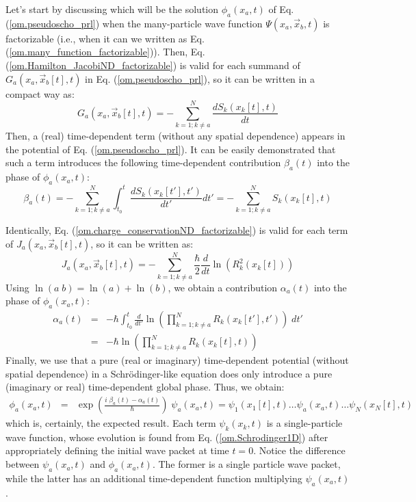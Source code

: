 \documentclass[onecolumn,nofootinbib, secnumarabic, amsmath, nobibnotes,12pt,aps,pra]{revtex4-1}
\newcommand{\eref}[1]{Eq. (\ref{#1})}
\begin{document}
Let's start by discussing which  will be the solution
$\phi_{a}(x_{a},t)$ of \eref{om.pseudoscho_prl} when the
many-particle wave function $\Psi(x_a,\vec x_b,t)$ is factorizable
(i.e., when it can we written as
\eref{om.many_function_factorizable}). Then,
\eref{om.Hamilton_JacobiND_factorizable} is valid for each summand
of $G_{a}(x_{a},\vec x_{b}[t],t)$ in
\eref{om.pseudoscho_prl}, so it can be written in a compact way as:
\begin{equation}
\label{om.prlpas_factorizable1}
G_{a}(x_{a},\vec x_{b}[t],t) = -\sum_{k = 1;k\neq a}^{N} \frac {d S_k(x_k[t],t)} {dt}
\end{equation}
Then, a (real) time-dependent term (without any spatial dependence)
appears in the potential of \eref{om.pseudoscho_prl}. It can be
easily demonstrated that such a term introduces the following
time-dependent contribution  \textit{$ \beta_a(t)$} into the phase of
$\phi_a(x_a,t)$:
\begin{equation}
\label{om.prlbeta}
\beta_a(t) = - \sum_{k = 1;k\neq a}^{N} \int_{t_0}^{t} \frac {d S_k(x_k[t'],t')} {dt'} dt' = -\sum_{k = 1;k\neq a}^{N} S_k(x_k[t],t)
\end{equation}

Identically, \eref{om.charge_conservationND_factorizable} is valid for each term of $J_{a}(x_{a},\vec x_{b}[t],t)$, so it can be written as:
\begin{equation}
\label{om.prlpas_factorizable2}
J_{a}(x_{a},\vec x_{b}[t],t) = -\sum_{k = 1;k\neq a}^{N} \frac {\hbar} {2} \frac {d} {dt} \ln \left( R_{k}^2(x_k[t]) \right)
\end{equation}
Using $\ln (a \; b) = \ln (a) + \ln (b)$, we obtain a contribution  $\alpha_a(t)$ into the phase of $\phi_a(x_a,t)$:
\begin{eqnarray}
\label{om.prlalpha} \alpha_a(t) &=& -\hbar \int_{t_0}^{t} \frac {d}
{dt'} \ln \left( \prod_{k = 1;k\neq a}^{N} R_k(x_k[t'],t') \right) \;
dt'\nonumber\\ &=& -\hbar \ln \left( \prod_{k = 1;k\neq a}^{N}
R_k(x_k[t],t) \right)
\end{eqnarray}
Finally, we use that a pure (real or imaginary) time-dependent
potential (without spatial dependence) in a Schr\"odinger-like
equation does only introduce a pure (imaginary or real)
time-dependent global phase. Thus, we obtain:
\begin{eqnarray}
\label{om.prlpas_factorizable3}
\phi_a(x_a,t) &=& \exp\left(\frac {i \; \beta_a(t)-\alpha_a(t)} {\hbar}\right) \;\psi_a(x_a,t)= \psi_1(x_1[t],t)\ldots\psi_a(x_a,t)\ldots\psi_N(x_N[t],t)
\end{eqnarray}
which is, certainly, the expected result. Each term \textit{$\psi_k(x_k,t)$} is a single-particle wave function, whose evolution is found from \eref{om.Schrodinger1D} after appropriately defining the initial wave packet at time $t = 0$. Notice the difference between $\psi_a(x_a,t)$ and $\phi_a(x_a,t)$. The former is a single particle wave packet, while the latter has an additional time-dependent function multiplying $\psi_a(x_a,t)$.
\end{document}
